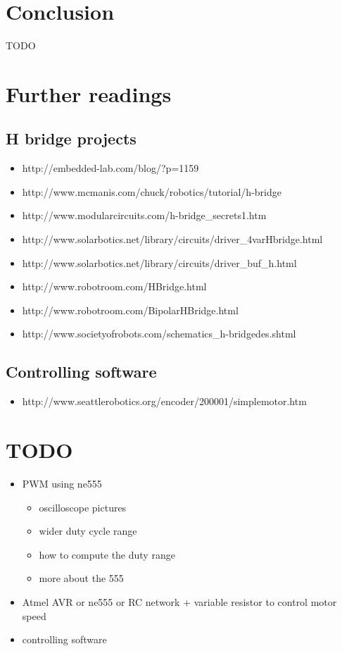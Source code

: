 \documentclass[12pt]{article}
\begin{document}
\newpage
\section{Conclusion}
TODO


\newpage
\section{Further readings}

\subsection{H bridge projects}
\begin{itemize}
  \item http://embedded-lab.com/blog/?p=1159
  \item http://www.mcmanis.com/chuck/robotics/tutorial/h-bridge
  \item http://www.modularcircuits.com/h-bridge\_secrets1.htm
  \item http://www.solarbotics.net/library/circuits/driver\_4varHbridge.html
  \item http://www.solarbotics.net/library/circuits/driver\_buf\_h.html
  \item http://www.robotroom.com/HBridge.html
  \item http://www.robotroom.com/BipolarHBridge.html
  \item http://www.societyofrobots.com/schematics\_h-bridgedes.shtml
\end{itemize}

\subsection{Controlling software}
\begin{itemize}
  \item http://www.seattlerobotics.org/encoder/200001/simplemotor.htm
\end{itemize}


\section{TODO}

\begin{itemize}
\item PWM using ne555
\begin{itemize}
  \item oscilloscope pictures
  \item wider duty cycle range
  \item how to compute the duty range
  \item more about the 555
\end{itemize}
\item Atmel AVR or ne555 or RC network + variable resistor to control motor speed
\item controlling software 
\end{itemize}
\end{document}
